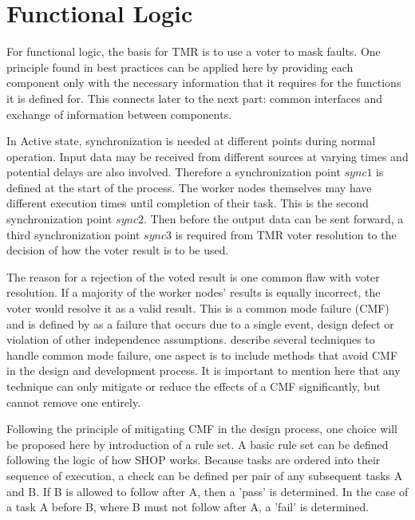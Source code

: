 

\section{Functional Logic}

For functional logic, the basis for TMR is to use a voter to mask faults. One principle found in best practices can be applied here by providing each component only with the necessary information that it requires for the functions it is defined for. This connects later to the next part: common interfaces and exchange of information between components.

In Active state, synchronization is needed at different points during normal operation.
Input data may be received from different sources at varying times and potential delays are also involved. Therefore a synchronization point \(sync1\) is defined at the start of the process. The worker nodes themselves may have different execution times until completion of their task. This is the second synchronization point \(sync2\). Then before the output data can be sent forward, a third synchronization point \(sync3\) is required from TMR voter resolution to the decision of how the voter result is to be used.



The reason for a rejection of the voted result is one common flaw with voter resolution. If a majority of the worker nodes' results is equally incorrect, the voter would resolve it as a valid result. This is a common mode failure (CMF) and is defined by \textcite{hodson_failure-tolerant_2024} as a failure that occurs due to a single event, design defect or violation of other independence assumptions. \textcite{mitra_common-mode_2000} describe several techniques to handle common mode failure, one aspect is to include methods that avoid CMF in the design and development process. It is important to mention here that any technique can only mitigate or reduce the effects of a CMF significantly, but cannot remove one entirely.

Following the principle of mitigating CMF in the design process, one choice will be proposed here by introduction of a rule set. A basic rule set can be defined following the logic of how SHOP works. Because tasks are ordered into their sequence of execution, a check can be defined per pair of any subsequent tasks A and B. If B is allowed to follow after A, then a 'pass' is determined. In the case of a task A before B, where B must not follow after A, a 'fail' is determined.

